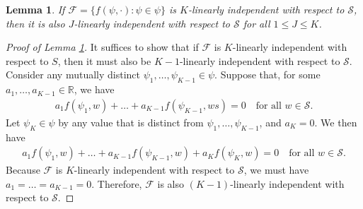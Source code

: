 \documentclass[11pt]{article}
\newtheorem{lemma}{Lemma}
\theoremstyle{definition}
\theoremstyle{remark}
\begin{document}
\begin{lemma}\label{lemma:linear_indep_less_K}
    If $\mathcal{F} = \{ f(\psi, \cdot): \psi \in \psi \}$ is $K$-linearly independent with respect to $\mathcal{S}$, 
    then it is also $J$-linearly independent with respect to $\mathcal{S}$ for all $1\le J\le K$.  
\end{lemma}

\begin{proof}[Proof of Lemma \ref{lemma:linear_indep_less_K}]
It suffices to show that if $\mathcal{F}$ is $K$-linearly independent with respect to $S$, then it must also be $K-1$-linearly independent with respect to $\mathcal{S}$. 
Consider any mutually distinct $\psi_1, \ldots, \psi_{K-1}\in \psi$. 
Suppose that, for some $a_1, \ldots, a_{K-1} \in \mathbb{R}$, we have 
\begin{align*}
    a_1 f(\psi_1, w) + \ldots + a_{K-1} f(\psi_{K-1},ws) = 0 \quad \text{for all } w \in \mathcal{S}. 
\end{align*}
Let $\psi_K \in \psi$ by any value that is distinct from $\psi_1, \ldots, \psi_{K-1}$, and $a_K = 0$. We then have 
\begin{align*}
    a_1 f(\psi_1, w) + \ldots + a_{K-1} f(\psi_{K-1}, w) + a_{K} f(\psi_{K}, w) = 0 \quad \text{for all } w \in \mathcal{S}. 
\end{align*}
Because $\mathcal{F}$ is $K$-linearly independent with respect to $\mathcal{S}$, we must have $a_1 = \ldots = a_{K-1} = 0$. 
Therefore, $\mathcal{F}$ is also $(K-1)$-linearly independent with respect to $\mathcal{S}$.
\end{proof}
\end{document}
